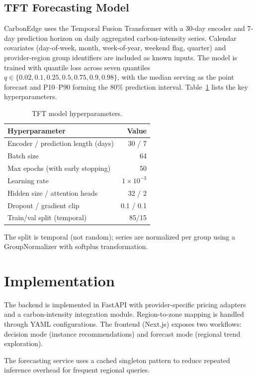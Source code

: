 \documentclass[12pt]{article}
\begin{document}
\subsection{TFT Forecasting Model}
CarbonEdge uses the Temporal Fusion Transformer \citep{b15} with a 30-day encoder and 7-day prediction horizon on daily aggregated carbon-intensity series. Calendar covariates (day-of-week, month, week-of-year, weekend flag, quarter) and provider-region group identifiers are included as known inputs. The model is trained with quantile loss across seven quantiles $q \in \{0.02, 0.1, 0.25, 0.5, 0.75, 0.9, 0.98\}$, with the median serving as the point forecast and P10--P90 forming the 80\% prediction interval. Table~\ref{tab:hyperparams} lists the key hyperparameters.

\begin{table}[!t]
\centering
\caption{TFT model hyperparameters.}
\label{tab:hyperparams}
\small
\begin{tabular}{lr}
\toprule
\textbf{Hyperparameter} & \textbf{Value} \\
\midrule
Encoder / prediction length (days) & 30 / 7 \\
Batch size & 64 \\
Max epochs (with early stopping) & 50 \\
Learning rate & $1\times10^{-3}$ \\
Hidden size / attention heads & 32 / 2 \\
Dropout / gradient clip & 0.1 / 0.1 \\
Train/val split (temporal) & 85/15 \\
\bottomrule
\end{tabular}
\end{table}

The split is temporal (not random); series are normalized per group using a GroupNormalizer with softplus transformation.

\section{Implementation}
The backend is implemented in FastAPI with provider-specific pricing adapters and a carbon-intensity integration module. Region-to-zone mapping is handled through YAML configurations. The frontend (Next.js) exposes two workflows: decision mode (instance recommendations) and forecast mode (regional trend exploration).

The forecasting service uses a cached singleton pattern to reduce repeated inference overhead for frequent regional queries.
\end{document}
